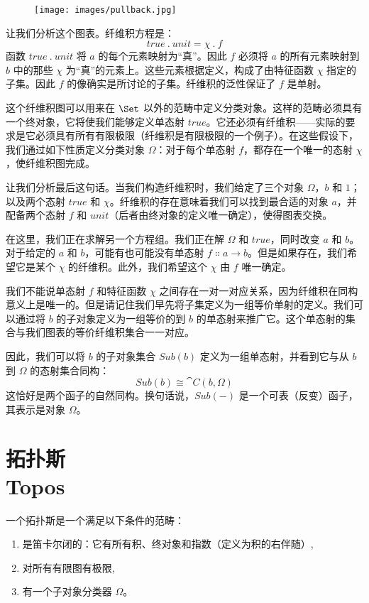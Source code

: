 \begin{figure}[H]
  \centering
  \texttt{[image: images/pullback.jpg]}
\end{figure}

\noindent
让我们分析这个图表。纤维积方程是：
\[\mathit{true}\ .\ \mathit{unit} = \chi\ .\ f\]
函数 $\mathit{true}\ .\ \mathit{unit}$ 将 $a$ 的每个元素映射为``真''。因此 $f$ 必须将 $a$ 的所有元素映射到 $b$ 中的那些 $\chi$ 为``真''的元素上。这些元素根据定义，构成了由特征函数 $\chi$ 指定的子集。因此 $f$ 的像确实是所讨论的子集。纤维积的泛性保证了 $f$ 是单射。

这个纤维积图可以用来在 $\Set$ 以外的范畴中定义分类对象。这样的范畴必须具有一个终对象，它将使我们能够定义单态射 $\mathit{true}$。它还必须有纤维积——实际的要求是它必须具有所有有限极限（纤维积是有限极限的一个例子）。在这些假设下，我们通过如下性质定义分类对象 $\Omega$：对于每个单态射 $f$，都存在一个唯一的态射 $\chi$，使纤维积图完成。

让我们分析最后这句话。当我们构造纤维积时，我们给定了三个对象 $\Omega$，$b$ 和 $1$；以及两个态射 $\mathit{true}$ 和 $\chi$。纤维积的存在意味着我们可以找到最合适的对象 $a$，并配备两个态射 $f$ 和 $\mathit{unit}$（后者由终对象的定义唯一确定），使得图表交换。

在这里，我们正在求解另一个方程组。我们正在解 $\Omega$ 和 $\mathit{true}$，同时改变 $a$ 和 $b$。对于给定的 $a$ 和 $b$，可能有也可能没有单态射 $f \Colon a \to b$。但是如果存在，我们希望它是某个 $\chi$ 的纤维积。此外，我们希望这个 $\chi$ 由 $f$ 唯一确定。

我们不能说单态射 $f$ 和特征函数 $\chi$ 之间存在一对一对应关系，因为纤维积在同构意义上是唯一的。但是请记住我们早先将子集定义为一组等价单射的定义。我们可以通过将 $b$ 的子对象定义为一组等价的到 $b$ 的单态射来推广它。这个单态射的集合与我们图表的等价纤维积集合一一对应。

因此，我们可以将 $b$ 的子对象集合 $\mathit{Sub}(b)$ 定义为一组单态射，并看到它与从 $b$ 到 $\Omega$ 的态射集合同构：
\[\mathit{Sub}(b) \cong \cat{C}(b, \Omega)\]
这恰好是两个函子的自然同构。换句话说，$\mathit{Sub}(-)$ 是一个可表（反变）函子，其表示是对象 $\Omega$。

\section{拓扑斯\\ \textmd{Topos}}

一个拓扑斯是一个满足以下条件的范畴：

\begin{enumerate}
  \tightlist
  \item
  是笛卡尔闭的：它有所有积、终对象和指数（定义为积的右伴随）,
  \item
  对所有有限图有极限,
  \item
  有一个子对象分类器 $\Omega$。
\end{enumerate}

